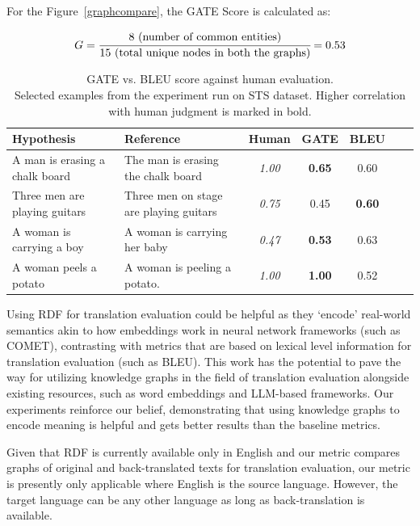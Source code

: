 \documentclass[runningheads]{llncs}
\begin{document}
\pagebreak

For the Figure~\ref{graphcompare}, the GATE Score is calculated as: 

\[{G} = \cfrac{8 \text{ (number of common entities)}}{15 \text{ (total unique nodes in both the graphs)}} = 0.53\]

\begin{table}
  \caption{GATE vs. BLEU score against human evaluation. \\Selected examples from the experiment run on STS dataset.
  Higher correlation with human judgment is marked in bold.
    }
    \begin{tabular}{llccccc}
  \hline    %
      Hypothesis&Reference&Human&GATE&BLEU\\
      \hline %
      A man is erasing a chalk board & The man is erasing the chalk board & \textit{1.00} & \textbf{0.65} & 0.60 \\
      Three men are playing guitars & Three men on stage are playing guitars & \textit{0.75} & 0.45 & \textbf{0.60} \\
      A woman is carrying a boy & A woman is carrying her baby & \textit{0.47} & \textbf{0.53} & 0.63 \\
      A woman peels a potato & A woman is peeling a potato. & \textit{1.00} & \textbf{1.00} & 0.52 \\
      \hline %
    \end{tabular}
    \label{examples}
  \end{table}


Using RDF for translation evaluation could be helpful as they `encode' real-world semantics akin to how embeddings work in neural network frameworks (such as COMET), contrasting with metrics that are based on lexical level information for translation evaluation (such as BLEU). This work has the potential to pave the way for utilizing knowledge graphs in the field of translation evaluation alongside existing resources, such as word embeddings and LLM-based frameworks. Our experiments reinforce our belief, demonstrating that using knowledge graphs to encode meaning is helpful and gets better results than the baseline metrics.

Given that RDF is currently available only in English and our metric compares graphs of original and back-translated texts for translation evaluation, our metric is presently only applicable where English is the source language. However, the target language can be any other language as long as back-translation is available.
\end{document}
